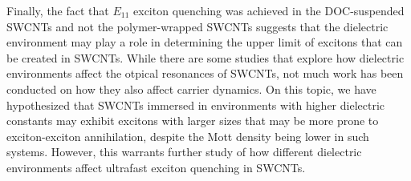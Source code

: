  Finally, the fact that $E_{11}$ exciton quenching was achieved in the DOC-suspended SWCNTs and not the polymer-wrapped SWCNTs suggests that the dielectric environment may play a role in determining the upper limit of excitons that can be created in SWCNTs. While there are some studies that explore how dielectric environments affect the otpical resonances of SWCNTs, not much work has been conducted on how they also affect carrier dynamics. On this topic, we have hypothesized that SWCNTs immersed in environments with higher dielectric constants may exhibit excitons with larger sizes that may be more prone to exciton-exciton annihilation, despite the Mott density being lower in such systems. However, this warrants further study of how different dielectric environments affect ultrafast exciton quenching in SWCNTs. 
